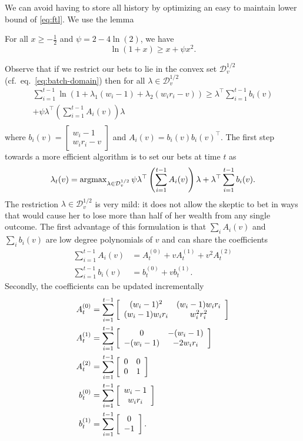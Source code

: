 We can avoid having to store all history by optimizing
an easy to maintain lower bound of \eqref{eq:ftl}.
We use the lemma
\begin{lemma} 
\label{lem:quadbound}
For all $x\geq -\frac{1}{2}$ and $\psi=2-4\ln(2)$, we have
\[
\ln(1+x)\geq x + \psi x^2.
\]
\end{lemma}
Observe that if we restrict our bets to lie in the convex set
$\mathcal{D}_v^{1/2}$ (cf.~eq.~\eqref{eq:batch-domain})
then for all $\lambda \in \mathcal{D}_v^{1/2}$
\begin{align*}
\sum_{i=1}^{t-1} \ln(1+\lambda_1 (w_i-1)+\lambda_2(w_i r_i - v)) 
\geq
\lambda^\top \sum_{i=1}^{t-1} b_i(v) \\
+\psi \lambda^\top \left(\sum_{i=1}^{t-1} A_i(v)\right) \lambda \\ 
\end{align*}
where 
$b_i(v)=
\left[\begin{array}{c} 
w_i-1 \\ w_i r_i -v 
\end{array}\right] 
$
and 
$
A_i(v) = b_i(v)b_i(v)^\top.
$
The first step towards a more efficient algorithm is to 
set our bets at time $t$ as
\begin{equation}
\lambda_t(v) = \operatorname{argmax}_{\lambda \in \mathcal{D}_{v}^{1/2}}
\psi  \lambda^\top \left(\sum_{i=1}^{t-1} A_i(v)\right) \lambda 
+ \lambda^\top \sum_{i=1}^{t-1} b_i(v).
\label{eq:quadoptv}
\end{equation}
The restriction $\lambda \in \mathcal{D}_{v}^{1/2}$ 
is very mild: it does 
not allow the skeptic to bet in ways that would cause her 
to lose more than half of her wealth from any single outcome.
The first advantage of this formulation is that 
$\sum_i A_i(v)$ and $\sum_i b_i(v)$ are low degree 
polynomials of $v$ and can share the coefficients
    \begin{align*}
        \sum_{i=1}^{t-1} A_i(v) &= 
        A_t^{(0)} + v A_t^{(1)} + v^2 A_t^{(2)}\\   
        \sum_{i=1}^{t-1} b_i(v) &= b_t^{(0)} + v b_t^{(1)}.  
    \end{align*}
Secondly, the coefficients can be updated incrementally
    \begin{align}
        A_t^{(0)} &=\sum_{i=1}^{t-1}\left[\begin{array}{cc} (w_i-1)^2 & (w_i-1)w_i r_i \\ (w_i-1)w_i r_i & w_i^2r_i^2 \end{array}\right] \label{eq:upsuffa0}\\
        A_t^{(1)} &= \sum_{i=1}^{t-1} \left[\begin{array}{cc} 0 & -(w_i-1) \\ -(w_i-1) & -2w_ir_i \end{array}\right]\\
        A_t^{(2)} &=\sum_{i=1}^{t-1}  \left[\begin{array}{cc} 0 & 0 \\ 0 & 1 \end{array}\right]\\
        b_t^{(0)} &=\sum_{i=1}^{t-1}  \left[\begin{array}{c} w_i-1 \\ w_ir_i \end{array}\right]\\
        b_t^{(1)} &=\sum_{i=1}^{t-1}  \left[\begin{array}{c} 0 \\ -1 \end{array}\right]. \label{eq:upsuffb1}
    \end{align}
